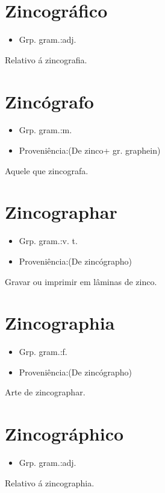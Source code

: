\section{Zincográfico}
\begin{itemize}
\item {Grp. gram.:adj.}
\end{itemize}
Relativo á zincografia.
\section{Zincógrafo}
\begin{itemize}
\item {Grp. gram.:m.}
\end{itemize}
\begin{itemize}
\item {Proveniência:(De \textunderscore zinco\textunderscore  + gr. \textunderscore graphein\textunderscore )}
\end{itemize}
Aquele que zincografa.
\section{Zincographar}
\begin{itemize}
\item {Grp. gram.:v. t.}
\end{itemize}
\begin{itemize}
\item {Proveniência:(De \textunderscore zincógrapho\textunderscore )}
\end{itemize}
Gravar ou imprimir em lâminas de zinco.
\section{Zincographia}
\begin{itemize}
\item {Grp. gram.:f.}
\end{itemize}
\begin{itemize}
\item {Proveniência:(De \textunderscore zincógrapho\textunderscore )}
\end{itemize}
Arte de zincographar.
\section{Zincográphico}
\begin{itemize}
\item {Grp. gram.:adj.}
\end{itemize}
Relativo á zincographia.
